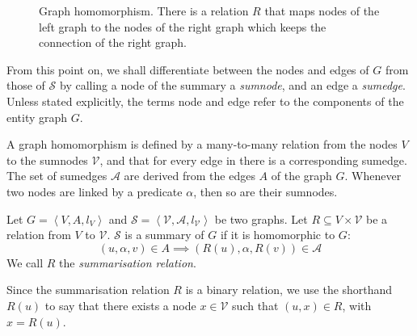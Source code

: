 \begin{figure}
	\centering
	
	\caption{Graph homomorphism. There is a relation $R$ that maps nodes of the left graph to the nodes of the right graph which keeps the connection of the right graph.}
	\label{fig:homomorphism}
\end{figure}

\begin{remark}
From this point on, we shall differentiate between the nodes and edges of $G$ from those of $\mathcal{S}$ by calling a node of the summary a \emph{sumnode}, and an edge a \emph{sumedge}. Unless stated explicitly, the terms node and edge refer to the components of the entity graph $G$.
\end{remark}

A graph homomorphism is defined by a many-to-many relation from the nodes $V$ to the sumnodes $\mathcal{V}$, and that for every edge in there is a corresponding sumedge. The set of sumedges $\mathcal{A}$ are derived from the edges $A$ of the graph $G$. Whenever two nodes are linked by a predicate $\alpha$, then so are their sumnodes.

\begin{definition}
Let $G=\left\langle V, A, l_V \right\rangle$ and $\mathcal{S}=\left\langle \mathcal{V}, \mathcal{A}, l_\mathcal{V} \right\rangle$ be two graphs. Let $R \subseteq V \times \mathcal{V}$ be a relation from $V$ to $\mathcal{V}$.
$\mathcal{S}$ is a summary of $G$ if it is homomorphic to $G$:
$$
(u, \alpha, v) \in A \implies \left(R(u), \alpha, R(v)\right) \in \mathcal{A}
$$
We call $R$ the \emph{summarisation relation}.
\end{definition}

\begin{remark}
Since the summarisation relation $R$ is a binary relation, we use the shorthand $R(u)$ to say that there exists a node $x \in \mathcal{V}$ such that $(u, x) \in R$, with $x = R(u)$.
\end{remark}


